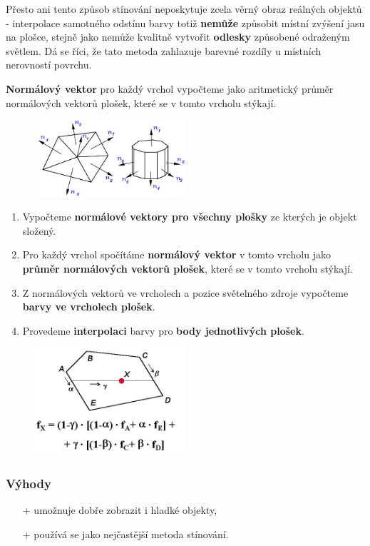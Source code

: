 Přesto ani tento způsob stínování neposkytuje zcela věrný obraz reálných objektů - interpolace samotného odstínu barvy totiž \textbf{nemůže} způsobit místní zvýšení jasu na plošce, stejně jako nemůže kvalitně vytvořit \textbf{odlesky} způsobené odraženým světlem. Dá se říci, že tato metoda zahlazuje barevné rozdíly u místních nerovností povrchu.

	\textbf{Normálový vektor} pro každý vrchol vypočteme jako aritmetický průměr normálových vektorů plošek, které se v tomto vrcholu stýkají.
\begin{figure}[H]
\centering
\includegraphics[width=0.5\textwidth]{assets/5_gouraud}
\end{figure}

\begin{enumerate}
	\item Vypočteme \textbf{normálové vektory pro všechny plošky} ze kterých je objekt složený.
	\item Pro každý vrchol spočítáme \textbf{normálový vektor} v tomto vrcholu jako \textbf{průměr normálových vektorů plošek}, které se v tomto vrcholu stýkají.
	\item Z normálových vektorů ve vrcholech a pozice světelného zdroje vypočteme \textbf{barvy ve vrcholech plošek}.
	\item Provedeme \textbf{interpolaci} barvy pro \textbf{body jednotlivých plošek}.
\end{enumerate}
		\begin{figure}[H]
		\centering
		\includegraphics[width=0.5\textwidth]{assets/5_gouradovo}
		\end{figure} 
		\subsubsection*{Výhody}
			\begin{itemize}
				\item[$+$] umožnuje dobře zobrazit i hladké objekty,
				\item[$+$] používá se jako nejčastější metoda stínování.
			\end{itemize}
